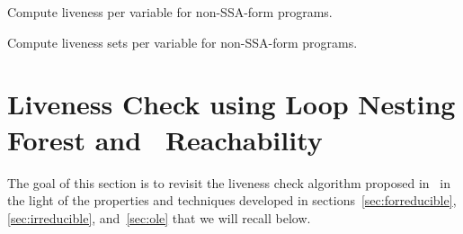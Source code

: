 \begin{algorithm}[H]
  \caption{Compute liveness per variable for non-SSA-form programs.}
  \label{alg:var_by_var_non_ssa}
\end{algorithm}

\begin{algorithm}[H]
  \caption{Compute liveness sets per variable for non-SSA-form programs.}
  \label{alg:up_and_mark_non_ssa}
\end{algorithm}


\section{Liveness Check using Loop Nesting Forest and \Reduced\ Reachability}
\label{sec:live-check}


The goal of this section is to revisit the liveness check algorithm proposed in~\cite{BoissinotHGDR08} in the light of the properties and techniques developed in sections~\ref{sec:forreducible}, \ref{sec:irreducible}, and~\ref{sec:ole} that we will recall below.

